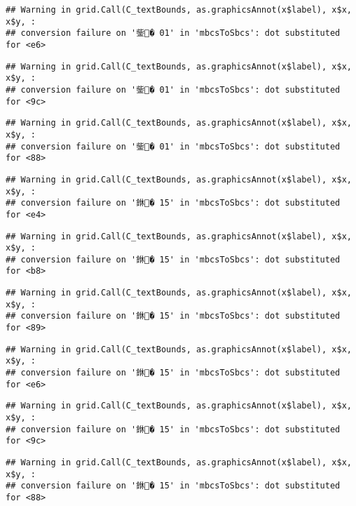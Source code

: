 \documentclass[]{article}
\begin{document}
\begin{verbatim}
## Warning in grid.Call(C_textBounds, as.graphicsAnnot(x$label), x$x, x$y, :
## conversion failure on '鈭� 01' in 'mbcsToSbcs': dot substituted for <e6>
\end{verbatim}

\begin{verbatim}
## Warning in grid.Call(C_textBounds, as.graphicsAnnot(x$label), x$x, x$y, :
## conversion failure on '鈭� 01' in 'mbcsToSbcs': dot substituted for <9c>
\end{verbatim}

\begin{verbatim}
## Warning in grid.Call(C_textBounds, as.graphicsAnnot(x$label), x$x, x$y, :
## conversion failure on '鈭� 01' in 'mbcsToSbcs': dot substituted for <88>
\end{verbatim}

\begin{verbatim}
## Warning in grid.Call(C_textBounds, as.graphicsAnnot(x$label), x$x, x$y, :
## conversion failure on '銝� 15' in 'mbcsToSbcs': dot substituted for <e4>
\end{verbatim}

\begin{verbatim}
## Warning in grid.Call(C_textBounds, as.graphicsAnnot(x$label), x$x, x$y, :
## conversion failure on '銝� 15' in 'mbcsToSbcs': dot substituted for <b8>
\end{verbatim}

\begin{verbatim}
## Warning in grid.Call(C_textBounds, as.graphicsAnnot(x$label), x$x, x$y, :
## conversion failure on '銝� 15' in 'mbcsToSbcs': dot substituted for <89>
\end{verbatim}

\begin{verbatim}
## Warning in grid.Call(C_textBounds, as.graphicsAnnot(x$label), x$x, x$y, :
## conversion failure on '銝� 15' in 'mbcsToSbcs': dot substituted for <e6>
\end{verbatim}

\begin{verbatim}
## Warning in grid.Call(C_textBounds, as.graphicsAnnot(x$label), x$x, x$y, :
## conversion failure on '銝� 15' in 'mbcsToSbcs': dot substituted for <9c>
\end{verbatim}

\begin{verbatim}
## Warning in grid.Call(C_textBounds, as.graphicsAnnot(x$label), x$x, x$y, :
## conversion failure on '銝� 15' in 'mbcsToSbcs': dot substituted for <88>
\end{verbatim}
\end{document}
